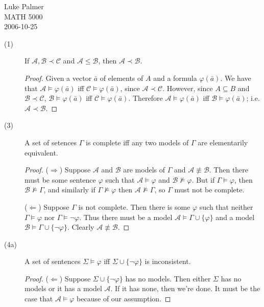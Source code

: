 \documentclass[12pt]{article}
\newcommand{\elemsubmodel}{\prec}
\newcommand{\submodel}{\le}
\begin{document}
\noindent Luke Palmer \\
MATH 5000 \\
2006-10-25

\begin{description}
\item[(1)] If $\mathcal{A},\mathcal{B} \elemsubmodel \mathcal{C}$ and
$\mathcal{A} \submodel \mathcal{B}$, then $\mathcal{A} \elemsubmodel
\mathcal{B}$.
  \begin{proof}
  Given a vector $\bar{a}$ of elements of $A$ and a formula
  $\varphi(\bar{a})$.   We have that $\mathcal{A} \models
  \varphi(\bar{a})$ iff $\mathcal{C} \models \varphi(\bar{a})$, since
  $\mathcal{A} \elemsubmodel \mathcal{C}$.  However, since $A \subseteq
  B$ and $\mathcal{B} \elemsubmodel \mathcal{C}$,  $\mathcal{B} \models
  \varphi(\bar{a})$ iff $\mathcal{C} \models \varphi(\bar{a})$.
  Therefore $\mathcal{A} \models \varphi(\bar{a})$ iff $\mathcal{B}
  \models \varphi(\bar{a})$; i.e. $\mathcal{A} \elemsubmodel
  \mathcal{B}$.
  \end{proof}

\item[(3)] A set of setences $\Gamma$ is complete iff any two models of
$\Gamma$ are elementarily equivalent.
  \begin{proof}
  ($\Rightarrow$)  Suppose $\mathcal{A}$ and $\mathcal{B}$ are models of
  $\Gamma$ and $\mathcal{A} \not\equiv \mathcal{B}$.  Then there must be
  some sentence $\varphi$ such that $\mathcal{A} \models \varphi$ and
  $\mathcal{B} \not\models \varphi$.  But if $\Gamma \models \varphi$,
  then $\mathcal{B} \not\models \Gamma$, and similarly if $\Gamma
  \not\models \varphi$ then $\mathcal{A} \not\models \Gamma$, so
  $\Gamma$ must not be complete.

  ($\Leftarrow$)  Suppose $\Gamma$ is not complete.  Then there is some
  $\varphi$ such that neither $\Gamma \models \varphi$ nor $\Gamma
  \models \neg\varphi$.  Thus there must be a model $\mathcal{A} \models
  \Gamma \cup \{\varphi\}$ and a model $\mathcal{B} \models \Gamma \cup
  \{\neg\varphi\}$.  Clearly $\mathcal{A} \not\equiv \mathcal{B}$.
  \end{proof}

\item[(4a)] A set of sentences $\Sigma \models \varphi$ iff $\Sigma \cup
\{\neg\varphi\}$ is inconsistent.
  \begin{proof}
  ($\Leftarrow$) Suppose $\Sigma \cup \{\neg\varphi\}$ has no models.
  Then either $\Sigma$ has no models or it has a model $\mathcal{A}$.
  If it has none, then we're done.  It must be the case that
  $\mathcal{A} \models \varphi$ because of our assumption.


\end{proof}
\end{description}
\end{document}
